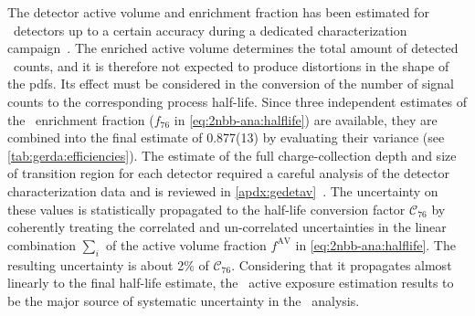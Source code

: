 \begin{description}[wide]
  \item[\gesix\ active exposure] The detector active volume and enrichment fraction has
    been estimated for \bege\ detectors up to a certain accuracy during a dedicated
    characterization campaign~\cite{Agostini2015e, Agostini2019}. The enriched active
    volume determines the total amount of detected \nnbb\ counts, and it is therefore not
    expected to produce distortions in the shape of the pdfs. Its effect must be
    considered in the conversion of the number of signal counts to the corresponding
    process half-life.  Since three independent estimates of the \bege\ enrichment
    fraction ($f_{76}$ in \cref{eq:2nbb-ana:halflife}) are available\cite{Agostini2015e},
    they are combined into the final estimate of 0.877(13) by evaluating their variance
    (see \cref{tab:gerda:efficiencies}). The estimate of the full charge-collection depth
    and size of transition region for each detector required a careful analysis of the
    detector characterization data and is reviewed in
    \cref{apdx:gedetav}~\cite{Agostini2019, Lehnert2016}. The uncertainty on these values
    is statistically propagated to the half-life conversion factor $\mathcal{C}_{76}$ by
    coherently treating the correlated and un-correlated uncertainties in the linear
    combination $\sum_i$ of the active volume fraction $f^\text{AV}$ in
    \cref{eq:2nbb-ana:halflife}. The resulting uncertainty is about 2\% of
    $\mathcal{C}_{76}$. Considering that it propagates almost linearly to the final
    half-life estimate, the \gesix\ active exposure estimation results to be the major
    source of systematic uncertainty in the \nnbb\ analysis.


\end{description}
